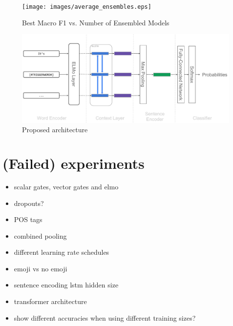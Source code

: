 \documentclass[11pt,a4paper]{article}
\begin{document}
\begin{figure}
    \centering
    \texttt{[image: images/average\_ensembles.eps]}
\caption{Best Macro F1 vs. Number of Ensembled Models}
\label{fig:}
\end{figure}

\begin{figure}
    \centering
    \includegraphics[width=\columnwidth]{images/iest_architecture.pdf}
    \caption{Proposed architecture}
    \label{fig:architecture}
\end{figure}



\section{(Failed) experiments}
\begin{itemize}
    \item scalar gates, vector gates and elmo
    \item dropouts?
    \item POS tags
    \item combined pooling
    \item different learning rate schedules
    \item emoji vs no emoji
    \item sentence encoding lstm hidden size
    \item transformer architecture
    \item show different accuracies when using different training sizes?
\end{itemize}
\end{document}
